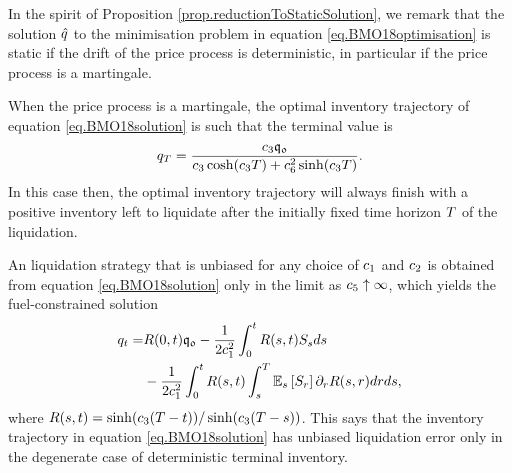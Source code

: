 \documentclass[10pt,a4paper]{article}
\begin{document}
\begin{remark}
  In the spirit of Proposition \ref{prop.reductionToStaticSolution}, we remark that the solution $\hat{q}$ to the minimisation problem in equation \eqref{eq.BMO18optimisation} is static if the drift of the price process is deterministic, in particular if the price process is a martingale. 
\end{remark}
\begin{remark}
  When the price process is a martingale, the optimal inventory trajectory of equation \eqref{eq.BMO18solution} is such that the terminal value is 
\begin{equation*}
q_T = \frac{c_{3} \mathfrak{q_0}}{c_{3} \cosh (c_{3} T ) + c_{6}^{2} \sinh(c_{3} T)}.
\end{equation*}
In this case then, the optimal inventory trajectory will always finish with a positive inventory left to liquidate after the initially fixed time horizon $T$ of the liquidation. 
\end{remark}

\begin{remark}
An liquidation strategy that is unbiased for any choice of $c_{1}$ and $c_{2}$ is obtained from equation \eqref{eq.BMO18solution} only in the limit as $c_{5} \uparrow \infty$, which yields the fuel-constrained solution 
\begin{equation*}
\begin{split}
q_t =& R(0,t)\mathfrak{q_0} - \frac{1}{2c_{1}^{2}} \int_{0}^{t} R(s,t)S_s ds \\ 
& - \frac{1}{2c_{1}^{2}} \int_{0}^{t} R(s,t) \int_{s}^{T} \mathbb{{E}}_s \left[ S_r\right] \partial_r R(s,r) dr ds,
\end{split}
\end{equation*}
where $R(s,t)= \sinh(c_{3} (T - t)) / \sinh(c_{3} (T - s))$. This says that the inventory trajectory in equation \eqref{eq.BMO18solution} has unbiased liquidation error only in the degenerate case of deterministic terminal inventory. 
\end{remark}
\end{document}
